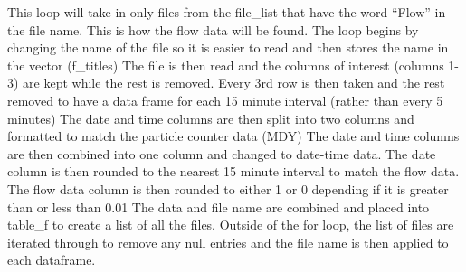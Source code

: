 \documentclass[
]{article}
\begin{document}
This loop will take in only files from the file\_list that have the word
``Flow'' in the file name. This is how the flow data will be found. The
loop begins by changing the name of the file so it is easier to read and
then stores the name in the vector (f\_titles) The file is then read and
the columns of interest (columns 1-3) are kept while the rest is
removed. Every 3rd row is then taken and the rest removed to have a data
frame for each 15 minute interval (rather than every 5 minutes) The date
and time columns are then split into two columns and formatted to match
the particle counter data (MDY) The date and time columns are then
combined into one column and changed to date-time data. The date column
is then rounded to the nearest 15 minute interval to match the flow
data. The flow data column is then rounded to either 1 or 0 depending if
it is greater than or less than 0.01 The data and file name are combined
and placed into table\_f to create a list of all the files. Outside of
the for loop, the list of files are iterated through to remove any null
entries and the file name is then applied to each dataframe.
\end{document}
